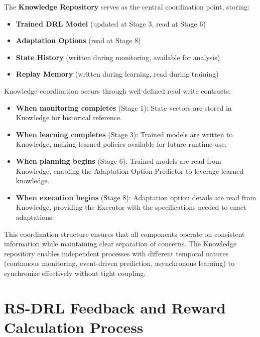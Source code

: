 \documentclass[11pt,a4paper]{article}
\begin{document}
The \textbf{Knowledge Repository} serves as the central coordination point, storing:
\begin{itemize}
    \item \textbf{Trained DRL Model} (updated at Stage 3, read at Stage 6)
    \item \textbf{Adaptation Options} (read at Stage 8)
    \item \textbf{State History} (written during monitoring, available for analysis)
    \item \textbf{Replay Memory} (written during learning, read during training)
\end{itemize}

Knowledge coordination occurs through well-defined read-write contracts:

\begin{itemize}
    \item \textbf{When monitoring completes} (Stage 1): State vectors are stored in Knowledge for historical reference.
    \item \textbf{When learning completes} (Stage 3): Trained models are written to Knowledge, making learned policies available for future runtime use.
    \item \textbf{When planning begins} (Stage 6): Trained models are read from Knowledge, enabling the Adaptation Option Predictor to leverage learned knowledge.
    \item \textbf{When execution begins} (Stage 8): Adaptation option details are read from Knowledge, providing the Executor with the specifications needed to enact adaptations.
\end{itemize}

This coordination structure ensures that all components operate on consistent information while maintaining clear separation of concerns. The Knowledge repository enables independent processes with different temporal natures (continuous monitoring, event-driven prediction, asynchronous learning) to synchronize effectively without tight coupling.


\section{RS-DRL Feedback and Reward Calculation Process}
\label{sec:interaction}
\end{document}
